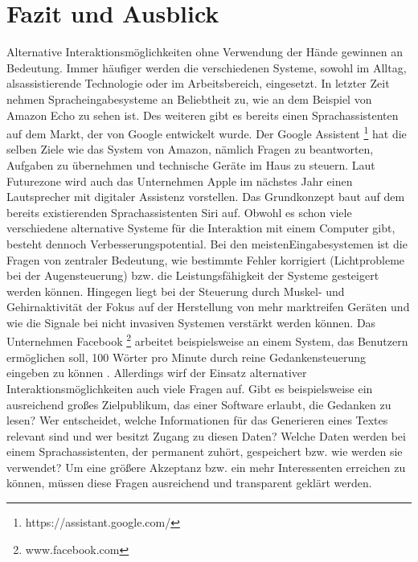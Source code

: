 \chapter{Fazit und Ausblick}

Alternative Interaktionsmöglichkeiten ohne Verwendung der Hände gewinnen an Bedeutung. Immer häufiger werden die verschiedenen Systeme, sowohl im Alltag, als\linebreak assistierende Technologie oder im Arbeitsbereich, eingesetzt.
\newline \newline
In letzter Zeit nehmen Spracheingabesysteme an Beliebtheit zu, wie an dem Beispiel von Amazon Echo zu sehen ist. Des weiteren gibt es bereits einen Sprachassistenten auf dem Markt, der von Google entwickelt wurde. Der Google Assistent%
\footnote{https://assistant.google.com/}
%
hat die selben Ziele wie das System von Amazon, nämlich Fragen zu beantworten, Aufgaben zu übernehmen und technische Geräte im Haus zu steuern. Laut Futurezone \cite{Futurezone} wird auch das Unternehmen Apple im nächstes Jahr einen Lautsprecher mit digitaler Assistenz vorstellen. Das Grundkonzept baut auf dem bereits existierenden Sprachassistenten Siri auf.
\newline \newline
Obwohl es schon viele verschiedene alternative Systeme für die Interaktion mit einem Computer gibt, besteht dennoch Verbesserungspotential. Bei den meisten\linebreak Eingabesystemen ist die Fragen von zentraler Bedeutung, wie bestimmte Fehler korrigiert (\zB Lichtprobleme bei der Augensteuerung) bzw. die Leistungsfähigkeit der Systeme gesteigert werden können. Hingegen liegt bei der Steuerung durch Muskel- und Gehirnaktivität der Fokus auf der Herstellung von mehr marktreifen Geräten und wie die Signale bei nicht invasiven Systemen verstärkt werden können. Das Unternehmen Facebook%
\footnote{www.facebook.com}
%
arbeitet beispielsweise an einem System, das Benutzern ermöglichen soll, 100 Wörter pro Minute durch reine Gedankensteuerung eingeben zu können \cite{Facebook}.
\newline \newline
Allerdings wirf der Einsatz alternativer Interaktionsmöglichkeiten auch viele Fragen auf. Gibt es beispielsweise ein ausreichend großes Zielpublikum, das einer Software erlaubt, die Gedanken zu lesen? Wer entscheidet, welche Informationen für das Generieren eines Textes relevant sind und wer besitzt Zugang zu diesen Daten? Welche Daten werden bei einem Sprachassistenten, der permanent zuhört, gespeichert bzw. wie werden sie verwendet? Um eine größere Akzeptanz bzw. ein mehr Interessenten erreichen zu können, müssen diese Fragen ausreichend und transparent geklärt werden.
